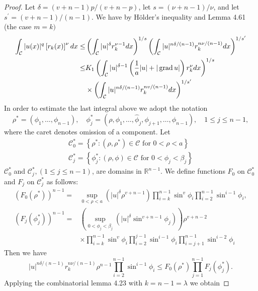 \begin{proof}
  Let $\delta=(v+n-1) p /(v+n-p)$, let $s=(\nu+n-1) / \nu$, and let $s^{\prime}=(v+n-1) /(n-1)$. We have by Hölder's inequality and Lemma 4.61 (the case $m=k)$
  \[
  \begin{aligned}
  \int_{\mathcal{C}}|u(x)|^q\left[r_k(x)\right]^\nu d x \leq & \left(\int_{\mathcal{C}}|u|^\delta r_k^{\nu-1} d x\right)^{1 / s}\left(\int_{\mathcal{C}}|u|^{n \delta /(n-1)} r_k^{n \nu /(n-1)} d x\right)^{1 / s^{\prime}} \\
  \leq & K_1\left(\int_{\mathcal{C}}|u|^{\delta-1}\left(\frac{1}{a}|u|+|\operatorname{grad} u|\right) r_k^\nu d x\right)^{1 / s} \\
  & \times\left(\int_{\mathcal{C}}|u|^{n \delta /(n-1)} r_k^{n v /(n-1)} d x\right)^{1 / s^{\prime}}
  \end{aligned}
  \]
  In order to estimate the last integral above we adopt the notation
  \[
  \rho^*=\left(\phi_1, \ldots, \phi_{n-1}\right), \quad \phi_j^*=\left(\rho, \phi_1, \ldots, \hat{\phi}_j, \phi_{j+1}, \ldots, \phi_{n-1}\right), \quad 1 \leq j \leq n-1,
  \]
  where the caret denotes omission of a component. Let
  \[
  \begin{gathered}
  \mathcal{C}_0^*=\left\{\rho^*:\left(\rho, \rho^*\right) \in \mathcal{C} \text { for } 0<\rho<a\right\} \\
  \mathcal{C}_j^*=\left\{\phi_j^*:(\rho, \phi) \in \mathcal{C} \text { for } 0<\phi_j<\beta_j\right\}
  \end{gathered}
  \]
  $\mathcal{C}_0^*$ and $\mathcal{C}_j^*,(1 \leq j \leq n-1)$, are domains in $\mathbb{R}^{n-1}$. We define functions $F_0$ on $\mathcal{C}_0^*$ and $F_j$ on $\mathcal{C}_j^*$ as follows:
  \[
  \begin{aligned}
  \left(F_0\left(\rho^*\right)\right)^{n-1}= & \sup _{0<\rho<a}\left(|u|^\delta \rho^{v+n-1}\right) \prod_{i=k}^{n-1} \sin ^v \phi_i \prod_{i=2}^{n-1} \sin ^{i-1} \phi_i, \\
  \left(F_j\left(\phi_j^*\right)\right)^{n-1}= & \left(\sup _{0<\phi_j<\beta_j}\left(|u|^\delta \sin ^{v+n-1} \phi_j\right)\right) \rho^{v+n-2} \\
  & \times \prod_{i=k}^{n-1} \sin ^v \phi_i \prod_{i=2}^{j-1} \sin ^{i-1} \phi_i \prod_{i=j+1}^{n-1} \sin ^{i-2} \phi_i
  \end{aligned}
  \]
  Then we have
  \[
  |u|^{n \delta /(n-1)} r_k^{n \nu /(n-1)} \rho^{n-1} \prod_{i=2}^{n-1} \sin ^{i-1} \phi_i \leq F_0\left(\rho^*\right) \prod_{j=1}^{n-1} F_j\left(\phi_j^*\right) .
  \]
  Applying the combinatorial lemma 4.23 with $k=n-1=\lambda$ we obtain

\end{proof}

